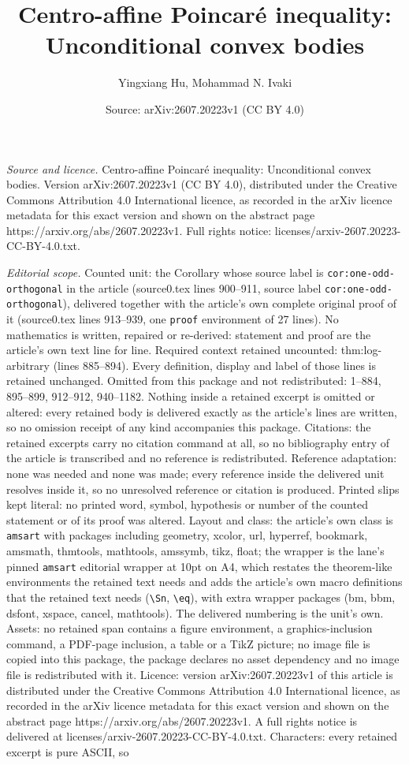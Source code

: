 \documentclass[10pt,a4paper]{amsart}
\title[Centro-affine Poincar\'e inequality: Unconditional convex bo]{Centro-affine Poincar\'e inequality: Unconditional convex bodies}
\author{Yingxiang Hu, Mohammad N. Ivaki}
\date{Source: arXiv:2607.20223v1 (CC BY 4.0)}
\begin{document}
\maketitle

\noindent\emph{Source and licence.} Centro-affine Poincar\'e inequality: Unconditional convex bodies. Version arXiv:2607.20223v1 (CC BY 4.0), distributed under the Creative Commons Attribution 4.0 International licence, as recorded in the arXiv licence metadata for this exact version and shown on the abstract page https://arxiv.org/abs/2607.20223v1. Full rights notice: licenses/arxiv-2607.20223-CC-BY-4.0.txt.\par\smallskip

\noindent\textit{Editorial scope.} Counted unit: the Corollary whose source label is \texttt{cor:one-odd-orthogonal} in the article (source0.tex lines 900--911, source label \texttt{cor:one-odd-orthogonal}), delivered together with the article's own complete original proof of it (source0.tex lines 913--939, one \texttt{proof} environment of 27 lines). No mathematics is written, repaired or re-derived: statement and proof are the article's own text line for line. Required context retained uncounted: thm:log-arbitrary (lines 885--894). Every definition, display and label of those lines is retained unchanged. Omitted from this package and not redistributed: 1--884, 895--899, 912--912, 940--1182. Nothing inside a retained excerpt is omitted or altered: every retained body is delivered exactly as the article's lines are written, so no omission receipt of any kind accompanies this package. Citations: the retained excerpts carry no citation command at all, so no bibliography entry of the article is transcribed and no reference is redistributed. Reference adaptation: none was needed and none was made; every reference inside the delivered unit resolves inside it, so no unresolved reference or citation is produced. Printed slips kept literal: no printed word, symbol, hypothesis or number of the counted statement or of its proof was altered. Layout and class: the article's own class is \texttt{amsart} with packages including geometry, xcolor, url, hyperref, bookmark, amsmath, thmtools, mathtools, amssymb, tikz, float; the wrapper is the lane's pinned \texttt{amsart} editorial wrapper at 10pt on A4, which restates the theorem-like environments the retained text needs and adds the article's own macro definitions that the retained text needs (\texttt{\textbackslash Sn}, \texttt{\textbackslash eq}), with extra wrapper packages (bm, bbm, dsfont, xspace, cancel, mathtools). The delivered numbering is the unit's own. Assets: no retained span contains a figure environment, a graphics-inclusion command, a PDF-page inclusion, a table or a TikZ picture; no image file is copied into this package, the package declares no asset dependency and no image file is redistributed with it. Licence: version arXiv:2607.20223v1 of this article is distributed under the Creative Commons Attribution 4.0 International licence, as recorded in the arXiv licence metadata for this exact version and shown on the abstract page https://arxiv.org/abs/2607.20223v1. A full rights notice is delivered at licenses/arxiv-2607.20223-CC-BY-4.0.txt. Characters: every retained excerpt is pure ASCII, so 
\end{document}
